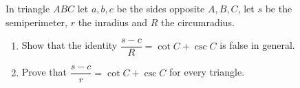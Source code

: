 In triangle $ABC$ let $a,b,c$ be the sides opposite $A,B,C$, let $s$ be the semiperimeter, $r$ the inradius and $R$ the circumradius.
\begin{enumerate}
\item[(a)] Show that the identity $\dfrac{s-c}{R}=\cot C+\csc C$ is false in general.
\item[(b)] Prove that $\dfrac{s-c}{r}=\cot C+\csc C$ for every triangle.
\end{enumerate}
